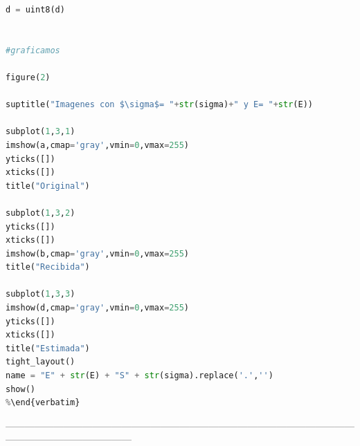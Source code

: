 \begin{lstlisting}[language=Python, caption=Ej1.py]
d = uint8(d)


#graficamos

figure(2)

suptitle("Imagenes con $\sigma$= "+str(sigma)+" y E= "+str(E))

subplot(1,3,1)
imshow(a,cmap='gray',vmin=0,vmax=255)
yticks([])
xticks([])
title("Original")

subplot(1,3,2)
yticks([])
xticks([])
imshow(b,cmap='gray',vmin=0,vmax=255)
title("Recibida")

subplot(1,3,3)
imshow(d,cmap='gray',vmin=0,vmax=255)
yticks([])
xticks([])
title("Estimada")
tight_layout()
name = "E" + str(E) + "S" + str(sigma).replace('.','')
show()
%\end{verbatim}
\end{lstlisting}
---------------------------------------------------------------------------------------------------------------------------------------------------
